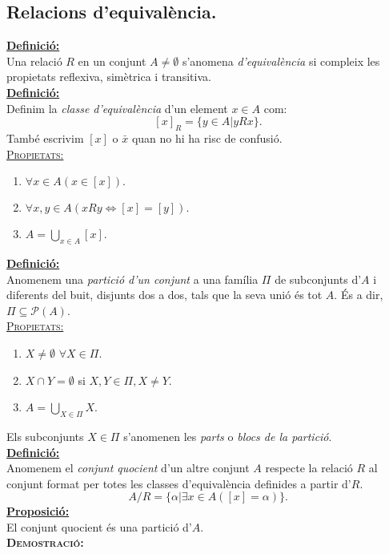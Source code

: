 \documentclass[11pt]{article}
\newcommand{\propietats}{\underline{{\scshape Propietats:}}}
\newcommand{\definicio}{\underline{\textbf{Definició:}}\\}
\newcommand{\proposicio}{\underline{\textbf{Proposició:}}\\}
\newcommand{\demostracio}{\textbf{{\scshape Demostració:}}\\}
\begin{document}
\subsection{Relacions d'equivalència.}
\definicio Una relació $R$ en un conjunt $A\neq\emptyset$ s'anomena \textit{d'equivalència} si compleix les propietats reflexiva, simètrica i transitiva.\\
\definicio Definim la \textit{classe d'equivalència} d'un element $x\in A$ com:$$[x]_R=\{y\in A|yRx\}.$$També escrivim $[x]$ o $\bar{x}$ quan no hi ha risc de confusió.\\
\propietats \begin{enumerate}
	\item $\forall x\in A(x\in [x]).$
	\item $\forall x,y\in A (xRy\iff [x]=[y]).$
	\item $A=\bigcup_{x\in A}[x].$
\end{enumerate}
\definicio Anomenem una \textit{partició d'un conjunt} a una família $\Pi$ de subconjunts d'$A$ i diferents del buit, disjunts dos a dos, tals que la seva unió és tot $A$. És a dir, $\Pi\subseteq\mathcal{P}(A)$.\\
\propietats
\begin{enumerate}
	\item $X\neq\emptyset$ $\forall X\in\Pi.$
	\item $X\cap Y = \emptyset$ si $X,Y\in\Pi,X\neq Y.$
	\item $A=\bigcup_{X\in\Pi}X.$
\end{enumerate}
Els subconjunts $X\in\Pi$ s'anomenen les \textit{parts} o \textit{blocs de la partició}.\\
\definicio Anomenem el \textit{conjunt quocient} d'un altre conjunt $A$ respecte la relació $R$ al conjunt format per totes les classes d'equivalència definides a partir d'$R$.$$A/R=\{\alpha|\exists x\in A([x]=\alpha)\}.$$
\proposicio El conjunt quocient és una partició d'$A$.\\
\demostracio 
\end{document}
